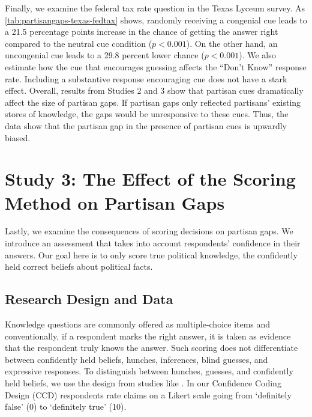 \documentclass[12pt, letterpaper]{article}
\begin{document}
Finally, we examine the federal tax rate question in the Texas Lyceum survey. As \cref{tab:partisangaps-texas-fedtax} shows, randomly receiving a congenial cue leads to a 21.5 percentage points increase in the chance of getting the answer right compared to the neutral cue condition ($p<0.001$). On the other hand, an uncongenial cue leads to a 29.8 percent lower chance ($p<0.001$). We also estimate how the cue that encourages guessing affects the ``Don't Know'' response rate. Including a substantive response encouraging cue does not have a stark effect. Overall, results from Studies 2 and 3 show that partisan cues dramatically affect the size of partisan gaps. If partisan gaps only reflected partisans' existing stores of knowledge, the gaps would be unresponsive to these cues. Thus, the data show that the partisan gap in the presence of partisan cues is upwardly biased.    

\section*{Study 3: The Effect of the Scoring Method on Partisan Gaps} \label{sec:confidence_coding}

Lastly, we examine the consequences of scoring decisions on partisan gaps. We introduce an assessment that takes into account respondents' confidence in their answers. Our goal here is to only score true political knowledge, the confidently held correct beliefs about political facts. 

\subsection*{Research Design and Data}\label{sec:data3}

Knowledge questions are commonly offered as multiple-choice items and conventionally, if a respondent marks the right answer, it is taken as evidence that the respondent truly knows the answer. Such scoring does not differentiate between confidently held beliefs, hunches, inferences, blind guesses, and expressive responses. To distinguish between hunches, guesses, and confidently held beliefs, we use the design from studies like \citet{pasek2015}. In our Confidence Coding Design (CCD) respondents rate claims on a Likert scale going from `definitely false' (0) to `definitely true' (10). 
\end{document}

